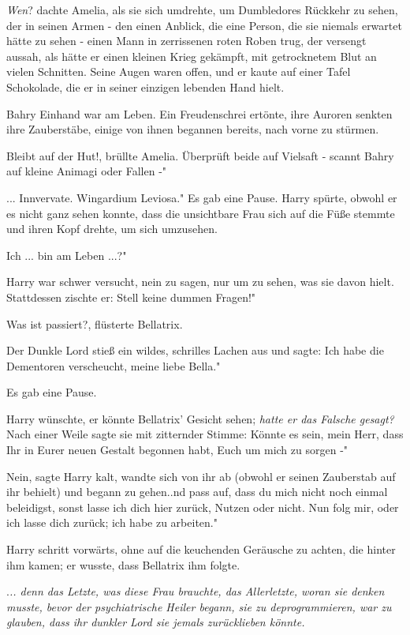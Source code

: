 \emph{Wen}? dachte Amelia, als sie sich umdrehte, um Dumbledores Rückkehr zu
sehen, der in seinen Armen - den einen Anblick, die eine Person, die sie niemals
erwartet hätte zu sehen - einen Mann in zerrissenen roten Roben trug, der
versengt aussah, als hätte er einen kleinen Krieg gekämpft, mit getrocknetem
Blut an vielen Schnitten. Seine Augen waren offen, und er kaute auf einer Tafel
Schokolade, die er in seiner einzigen lebenden Hand hielt.

Bahry Einhand war am Leben. Ein Freudenschrei ertönte, ihre Auroren senkten ihre
Zauberstäbe, einige von ihnen begannen bereits, nach vorne zu stürmen.

\glqq{}Bleibt auf der Hut!\grqq{}, brüllte Amelia. \glqq{}Überprüft beide auf
Vielsaft - scannt Bahry auf kleine Animagi oder Fallen -"

... \glqq{}Innvervate. Wingardium Leviosa." Es gab eine Pause. Harry spürte,
obwohl er es nicht ganz sehen konnte, dass die unsichtbare Frau sich auf die
Füße stemmte und ihren Kopf drehte, um sich umzusehen.

\glqq{}Ich ... bin am Leben ...?"

Harry war schwer versucht, nein zu sagen, nur um zu sehen, was sie davon hielt.
Stattdessen zischte er: \glqq{}Stell keine dummen Fragen!"

\glqq{}Was ist passiert?\grqq{}, flüsterte Bellatrix.

Der Dunkle Lord stieß ein wildes, schrilles Lachen aus und sagte: \glqq{}Ich habe
die Dementoren verscheucht, meine liebe Bella."

Es gab eine Pause.

Harry wünschte, er könnte Bellatrix' Gesicht sehen; \emph{hatte er das Falsche
gesagt?} Nach einer Weile sagte sie mit zitternder Stimme: \glqq{}Könnte es sein,
mein Herr, dass Ihr in Eurer neuen Gestalt begonnen habt, Euch um mich zu sorgen
-"

\glqq{}Nein\grqq{}, sagte Harry kalt, wandte sich von ihr ab (obwohl er seinen
Zauberstab auf ihr behielt) und begann zu gehen.\grqq{}.nd pass auf, dass du
mich nicht noch einmal beleidigst, sonst lasse ich dich hier zurück, Nutzen oder
nicht. Nun folg mir, oder ich lasse dich zurück; ich habe zu arbeiten."

Harry schritt vorwärts, ohne auf die keuchenden Geräusche zu achten, die hinter
ihm kamen; er wusste, dass Bellatrix ihm folgte.

.\emph{.. denn das Letzte, was diese Frau brauchte, das Allerletzte, woran sie
denken musste, bevor der psychiatrische Heiler begann, sie zu deprogrammieren,
war zu glauben, dass ihr dunkler Lord sie jemals zurücklieben könnte.}

